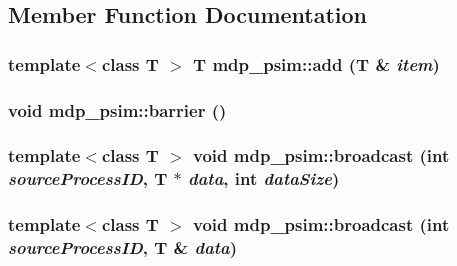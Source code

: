 \subsection{Member Function Documentation}
\hypertarget{classmdp__psim_a1506ab965569ee72e802616b827d896a}{
\subsubsection[{add}]{\setlength{\rightskip}{0pt plus 5cm}template$<$class T $>$ T mdp\_\-psim::add (T \& {\em item})}}
\label{classmdp__psim_a1506ab965569ee72e802616b827d896a}
\hypertarget{classmdp__psim_a3eb8abda43cf50aacc0c18fdecff8d9d}{
\subsubsection[{barrier}]{\setlength{\rightskip}{0pt plus 5cm}void mdp\_\-psim::barrier ()}}
\label{classmdp__psim_a3eb8abda43cf50aacc0c18fdecff8d9d}
\hypertarget{classmdp__psim_a97a76aa0dac23f5da0dea00dcaa6b568}{
\subsubsection[{broadcast}]{\setlength{\rightskip}{0pt plus 5cm}template$<$class T $>$ void mdp\_\-psim::broadcast (int {\em sourceProcessID}, \/  T $\ast$ {\em data}, \/  int {\em dataSize})}}
\label{classmdp__psim_a97a76aa0dac23f5da0dea00dcaa6b568}
\hypertarget{classmdp__psim_a5bc9df8615a06e02b78114ac10e9b5dd}{
\subsubsection[{broadcast}]{\setlength{\rightskip}{0pt plus 5cm}template$<$class T $>$ void mdp\_\-psim::broadcast (int {\em sourceProcessID}, \/  T \& {\em data})}}
